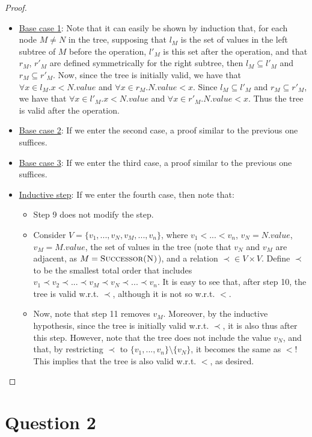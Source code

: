 \documentclass[a4paper,11pt]{scrartcl}
\begin{document}
\begin{proof}
\begin{itemize}
\item \underline{Base case 1}: Note that it can easily be shown by induction that, for each node $M \neq N$ in the tree, supposing that $l_M$ is the set of values in the left subtree of $M$ before the operation, $l'_M$ is this set after the operation, and that $r_M$, $r'_M$ are defined symmetrically for the right subtree, then $l_M \subseteq l'_M$ and $r_M \subseteq r'_M$. Now, since the tree is initially valid, we have that $\forall x \in l_M . x < N.value$ and $\forall x \in r_M . N.value < x$. Since $l_M \subseteq l'_M$ and $r_M \subseteq r'_M$, we have that $\forall x \in l'_M . x < N.value$ and $\forall x \in r'_M . N.value < x$. Thus the tree is valid after the operation.
\item \underline{Base case 2}: If we enter the second case, a proof similar to the previous one suffices.
\item \underline{Base case 3}: If we enter the third case, a proof similar to the previous one suffices.
\item \underline{Inductive step}: If we enter the fourth case, then note that:
    \begin{itemize}
    \item Step 9 does not modify the step.
    \item Consider $V = \{v_1, ..., v_N, v_M, ..., v_n\}$, where $v_1 < ... < v_n$, $v_N = N.value$, $v_M = M.value$, the set of values in the tree (note that $v_N$ and $v_M$ are adjacent, as $M = \textsc{Successor(N)}$), and a relation $\prec \in V \times V$. Define $\prec$ to be the smallest total order that includes $v_1 \prec v_2 \prec ... \prec v_M \prec v_N \prec ... \prec v_n$. It is easy to see that, after step 10, the tree is valid w.r.t. $\prec$, although it is not so w.r.t. $<$.
    \item Now, note that step 11 removes $v_M$. Moreover, by the inductive hypothesis, since the tree is initially valid w.r.t. $\prec$, it is also thus after this step. However, note that the tree does not include the value $v_N$, and that, by restricting $\prec$ to $\{v_1, ..., v_n\} \setminus \{v_N\}$, it becomes the same as $<$! This implies that the tree is also valid w.r.t. $<$, as desired.
    \end{itemize}
\end{itemize}

\end{proof}

\section*{Question 2}
\end{document}
